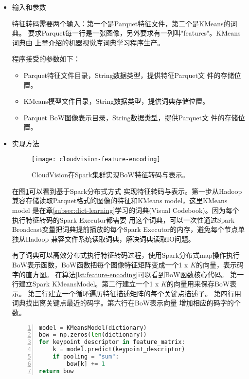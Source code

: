 \begin{itemize}
  \item 输入和参数 

        特征转码需要两个输入：第一个是Parquet特征文件，第二个是KMeans的词典。
        要求Parquet每一行是一张图像，另外要求有一列叫"features"。KMeans词典由
        上章介绍的机器视觉库词典学习程序生产。

        程序接受的参数如下：
        \begin{itemize}
          \item Parquet特征文件目录，String数据类型，提供特征Parquet文
                件的存储位置。
          \item KMeans模型文件目录，String数据类型，提供词典存储位置。
          \item Parquet BoW图像表示目录，String数据类型，提供Parquet文
                件的存储位置。
        \end{itemize}
  \item 实现方法

       \begin{figure}[h]
          \centering
            \texttt{[image: cloudvision-feature-encoding]}
          \caption{CloudVision在Spark集群实现BoW特征转码与表示。}
          \label{fig:cloudvision-feature-encoding}
        \end{figure}
        在图\ref{fig:cloudvision-feature-encoding}可以看到基于Spark分布式方式
        实现特征转码与表示。第一步从Hadoop兼容存储读取Parquet格式的图像的特征和KMeans model，这里KMeans model
        是在章\ref{subsec:dict-learning}学习的词典(Visual Codebook)。因为每个执行特征转码的Spark Executor都需要
        用这个词典，可以一次性通过Spark Broadcast变量把词典提前播放的每个Spark Executor的内存，避免每个节点单独从Hadoop
        兼容文件系统读取词典，解决词典读取IO问题。\cite{spark-programming-guide}

        有了词典可以高效分布式执行特征转码过程，使用Spark分布式map操作执行
        BoW表示函数，BoW函数把每个图像特征矩阵变成一个1 x $K$的向量，表示码字的直方图。
        在算法\ref{lst:feature-encoding}可以看到BoW函数核心代码。
        第一行建立Spark KMeansModel。第二行建立一个1 x $K$的向量用来保存BoW表示。
        第三行建立一个循环遍历特征描述矩阵的每个关键点描述子。
        第四行用词典找出离关键点最近的码字。第六行在BoW表示向量
        增加相应的码字的个数。
        \begin{minipage}{\textwidth}
        \begin{lstlisting}[language=Python,
                           basicstyle=\small,
                           numbers=left,
                           showstringspaces=false,
                           caption={BoW特征转码核心代码},
                           label={lst:feature-encoding}]
model = KMeansModel(dictionary)
bow = np.zeros(len(dictionary))
for keypoint_descriptor in feature_matrix:
    k = model.predict(keypoint_descriptor)
    if pooling = "sum":
        bow[k] += 1
return bow
        \end{lstlisting}
        \end{minipage}


\end{itemize}
